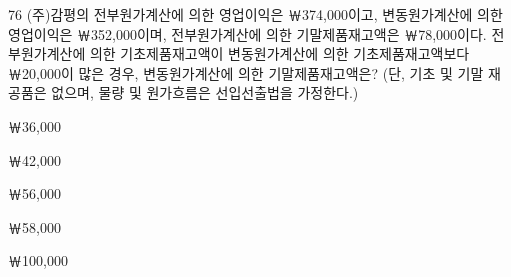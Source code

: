 \begin{question}{76}
(주)감평의 전부원가계산에 의한 영업이익은 ￦374,000이고, 변동원가계산에 의한 영업이익은 ￦352,000이며, 전부원가계산에 의한 기말제품재고액은 ￦78,000이다. 전부원가계산에 의한 기초제품재고액이 변동원가계산에 의한 기초제품재고액보다 ￦20,000이 많은 경우, 변동원가계산에 의한 기말제품재고액은? (단, 기초 및 기말 재공품은 없으며, 물량 및 원가흐름은 선입선출법을 가정한다.)
\begin{choices}
  \item ￦36,000
  \item ￦42,000
  \item ￦56,000
  \item ￦58,000
  \item ￦100,000
\end{choices}
\end{question}
